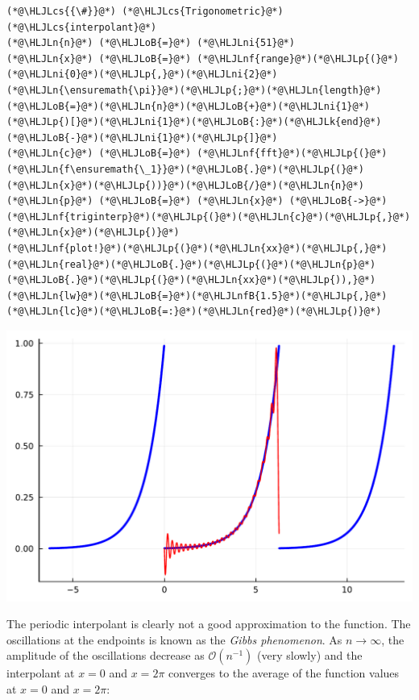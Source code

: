 \documentclass[12pt,landscape]{article}
\newcommand{\HLJLk}[1]{\textcolor[RGB]{148,91,176}{\textbf{#1}}}
\newcommand{\HLJLn}[1]{#1}
\newcommand{\HLJLnf}[1]{\textcolor[RGB]{66,102,213}{#1}}
\newcommand{\HLJLnfB}[1]{\textcolor[RGB]{59,151,46}{#1}}
\newcommand{\HLJLni}[1]{\textcolor[RGB]{59,151,46}{#1}}
\newcommand{\HLJLoB}[1]{\textcolor[RGB]{102,102,102}{\textbf{#1}}}
\newcommand{\HLJLp}[1]{#1}
\newcommand{\HLJLcs}[1]{\textcolor[RGB]{153,153,119}{\textit{#1}}}
\begin{document}
{\begin{lstlisting}
(*@\HLJLcs{{\#}}@*) (*@\HLJLcs{Trigonometric}@*) (*@\HLJLcs{interpolant}@*)
(*@\HLJLn{n}@*) (*@\HLJLoB{=}@*) (*@\HLJLni{51}@*)
(*@\HLJLn{x}@*) (*@\HLJLoB{=}@*) (*@\HLJLnf{range}@*)(*@\HLJLp{(}@*)(*@\HLJLni{0}@*)(*@\HLJLp{,}@*)(*@\HLJLni{2}@*)(*@\HLJLn{\ensuremath{\pi}}@*)(*@\HLJLp{;}@*)(*@\HLJLn{length}@*)(*@\HLJLoB{=}@*)(*@\HLJLn{n}@*)(*@\HLJLoB{+}@*)(*@\HLJLni{1}@*)(*@\HLJLp{)[}@*)(*@\HLJLni{1}@*)(*@\HLJLoB{:}@*)(*@\HLJLk{end}@*)(*@\HLJLoB{-}@*)(*@\HLJLni{1}@*)(*@\HLJLp{]}@*)
(*@\HLJLn{c}@*) (*@\HLJLoB{=}@*) (*@\HLJLnf{fft}@*)(*@\HLJLp{(}@*)(*@\HLJLn{f\ensuremath{\_1}}@*)(*@\HLJLoB{.}@*)(*@\HLJLp{(}@*)(*@\HLJLn{x}@*)(*@\HLJLp{))}@*)(*@\HLJLoB{/}@*)(*@\HLJLn{n}@*)
(*@\HLJLn{p}@*) (*@\HLJLoB{=}@*) (*@\HLJLn{x}@*) (*@\HLJLoB{->}@*) (*@\HLJLnf{triginterp}@*)(*@\HLJLp{(}@*)(*@\HLJLn{c}@*)(*@\HLJLp{,}@*) (*@\HLJLn{x}@*)(*@\HLJLp{)}@*)
(*@\HLJLnf{plot!}@*)(*@\HLJLp{(}@*)(*@\HLJLn{xx}@*)(*@\HLJLp{,}@*)(*@\HLJLn{real}@*)(*@\HLJLoB{.}@*)(*@\HLJLp{(}@*)(*@\HLJLn{p}@*)(*@\HLJLoB{.}@*)(*@\HLJLp{(}@*)(*@\HLJLn{xx}@*)(*@\HLJLp{)),}@*)(*@\HLJLn{lw}@*)(*@\HLJLoB{=}@*)(*@\HLJLnfB{1.5}@*)(*@\HLJLp{,}@*)(*@\HLJLn{lc}@*)(*@\HLJLoB{=:}@*)(*@\HLJLn{red}@*)(*@\HLJLp{)}@*)
\end{lstlisting}

\includegraphics[width=\linewidth]{jl_qsW2Qg/Fourier_23_1.pdf}

The periodic interpolant is clearly not a good approximation to the function.  The oscillations at the endpoints is known as the \emph{Gibbs phenomenon}.  As $n \to \infty$, the amplitude of the oscillations decrease as $\mathcal{O}(n^{-1})$ (very slowly) and the interpolant at $x=0$ and $x =2\pi$ converges to the average of the function values at  $x=0$ and $x =2\pi$:

}
\end{document}
